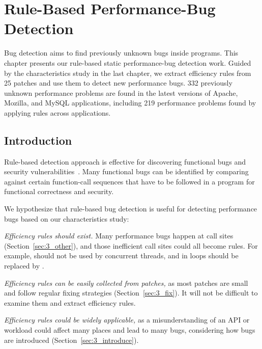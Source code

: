 \chapter[Rule-Based Performance-Bug Detection]{Rule-Based Performance-Bug Detection}
\label{chap:detec}

Bug detection aims to find previously unknown bugs inside programs. 
This chapter presents our rule-based static performance-bug detection work. 
Guided by the characteristics study in the last chapter, we extract efficiency rules 
from 25 patches and use them to detect new performance bugs. 
332 previously unknown performance problems are 
found in the latest versions of Apache, Mozilla, and MySQL applications, 
including 219 performance problems found by applying rules across applications.


\section{Introduction}
\label{sec:4_intro}

Rule-based detection approach is effective for discovering functional bugs
and security vulnerabilities~\citep{chouasplos00,billpugh,PRMiner05,semanticpatch,fortify}. 
Many functional bugs can be identified by comparing against certain 
function-call sequences that have to be followed in a program 
for functional correctness and security.

We hypothesize that rule-based bug detection is useful for detecting performance 
bugs based on our characteristics study:

\emph{Efficiency rules should exist.} Many performance bugs happen at call sites (Section~\ref{sec:3_other}), 
and those inefficient call sites could all become rules.
For example,  should not be used by concurrent threads, and
 in loops should be replaced by .

\emph{Efficiency rules can be easily collected from patches,} as 
most patches are small and follow regular fixing strategies 
(Section~\ref{sec:3_fix}).
It will not be difficult to examine them and extract efficiency rules.

\emph{Efficiency rules could be widely applicable,} as 
a misunderstanding of an API or workload could affect many places and
lead to many bugs, considering how bugs are introduced 
(Section~\ref{sec:3_introduce}).

